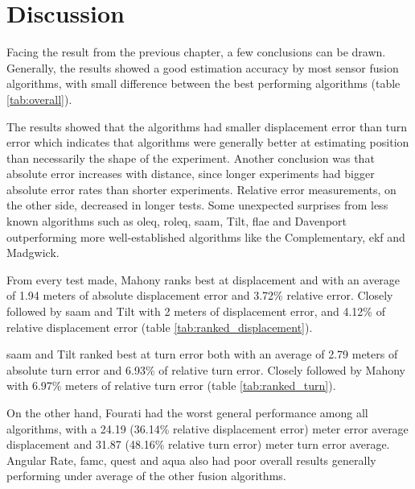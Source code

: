 \section{Discussion}
Facing the result from the previous chapter, a few conclusions can be drawn. Generally, the results showed a good estimation accuracy by most sensor fusion algorithms, with small difference between the best performing algorithms (table \ref{tab:overall}).



The results showed that the algorithms had smaller displacement error than turn error which indicates that algorithms were generally better at estimating position than necessarily the shape of the experiment. Another conclusion was that absolute error increases with distance, since longer experiments had bigger absolute error rates than shorter experiments. Relative error measurements, on the other side, decreased in longer tests. Some unexpected surprises from less known algorithms such as \acrshort{oleq}, \acrshort{roleq}, \acrshort{saam}, Tilt, \acrshort{flae} and Davenport outperforming more well-established algorithms like the Complementary, \acrshort{ekf} and Madgwick.

From every test made, Mahony ranks best at displacement and with an average of 1.94 meters of absolute displacement error and 3.72\% relative error. Closely followed by \acrshort{saam} and Tilt with 2 meters of displacement error, and 4.12\% of relative displacement error (table \ref{tab:ranked_displacement}).



\acrshort{saam} and Tilt ranked best at turn error both with an average of 2.79 meters of absolute turn error and 6.93\% of relative turn error. Closely followed by Mahony with 6.97\% meters of relative turn error (table \ref{tab:ranked_turn}).



On the other hand, Fourati had the worst general performance among all algorithms, with a 24.19 (36.14\% relative displacement error) meter error average displacement and 31.87 (48.16\% relative turn error) meter turn error average. Angular Rate, \acrshort{famc}, \acrshort{quest} and \acrshort{aqua} also had poor overall results generally performing under average of the other fusion algorithms.


